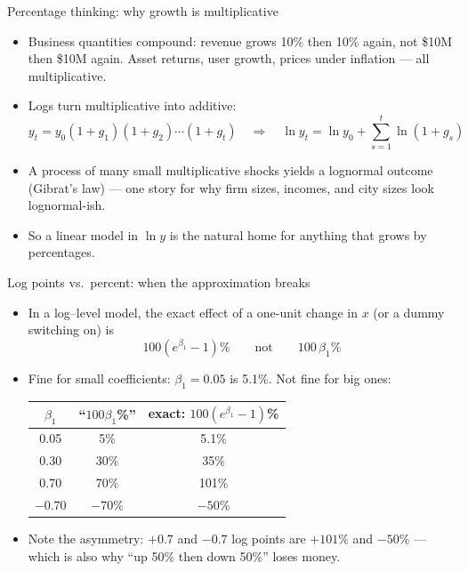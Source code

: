 \documentclass[aspectratio=169,11pt]{beamer}
\begin{document}
\begin{frame}{Percentage thinking: why growth is multiplicative}
\begin{itemize}
	\item Business quantities \alert{compound}: revenue grows 10\% then 10\% again,
	not \$10M then \$10M again. Asset returns, user growth, prices under inflation ---
	all multiplicative.

	\medskip
	\item Logs turn multiplicative into additive:\[
	y_t = y_0 (1+g_1)(1+g_2)\cdots(1+g_t) \quad \Longrightarrow \quad
	\ln y_t = \ln y_0 + \textstyle\sum_{s=1}^{t} \ln(1+g_s)
	\]

	\medskip
	\item A process of many small multiplicative shocks yields a \alert{lognormal}
	outcome (Gibrat's law) --- one story for why firm sizes, incomes, and city sizes
	look lognormal-ish.

	\medskip
	\item So a linear model in $\ln y$ is the natural home for anything that grows
	by percentages.
\end{itemize}
\end{frame}


\begin{frame}{Log points vs.\ percent: when the approximation breaks}
\begin{itemize}
	\item In a log--level model, the exact effect of a one-unit change in $x$ (or a
	dummy switching on) is\[
	100 \left( e^{\beta_1} - 1 \right)\% \qquad \text{not} \qquad 100\,\beta_1 \%
	\]

	\medskip
	\item Fine for small coefficients: $\beta_1 = 0.05$ is 5.1\%. Not fine for big ones:
	\begin{center}
	\begin{tabular}{ccc}
	$\beta_1$ & ``$100\beta_1$\%'' & exact: $100\left(e^{\beta_1}-1\right)$\% \\
	\hline
	0.05 & 5\% & 5.1\% \\
	0.30 & 30\% & 35\% \\
	0.70 & 70\% & \alert{101\%} \\
	$-0.70$ & $-70$\% & \alert{$-50$\%} \\
	\end{tabular}
	\end{center}

	\medskip
	\item Note the asymmetry: $+0.7$ and $-0.7$ log points are $+101\%$ and $-50\%$
	--- which is also why ``up 50\% then down 50\%'' loses money.
\end{itemize}
\end{frame}
\end{document}
